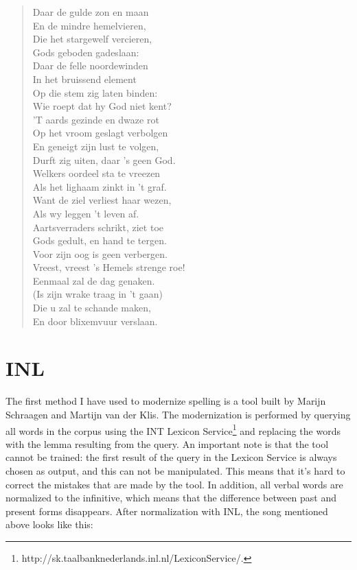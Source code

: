 \begin{quote}
	Daar de gulde zon en maan\\
	En de mindre hemelvieren,\\
	Die het stargewelf vercieren,\\
	Gods geboden gadeslaan:\\
	Daar de felle noordewinden\\
	In het bruissend element\\
	Op die stem zig laten binden:\\
	Wie roept dat hy God niet kent?\\
	
	'T aards gezinde en dwaze rot\\
	Op het vroom geslagt verbolgen\\
	En geneigt zijn lust te volgen,\\
	Durft zig uiten, daar 's geen God.\\
	Welkers oordeel sta te vreezen\\
	Als het lighaam zinkt in 't graf.\\
	Want de ziel verliest haar wezen,\\
	Als wy leggen 't leven af.\\
	
	Aartsverraders schrikt, ziet toe\\
	Gods gedult, en hand te tergen.\\
	Voor zijn oog is geen verbergen.\\
	Vreest, vreest 's Hemels strenge roe!\\
	Eenmaal zal de dag genaken.\\
	(Is zijn wrake traag in 't gaan)\\
	Die u zal te schande maken,\\
	En door blixemvuur verslaan.
\end{quote}

\section{INL}
The first method I have used to modernize spelling is a tool built by Marijn Schraagen and Martijn van der Klis. The modernization is performed by querying all words in the corpus using the INT Lexicon Service\footnote{http://sk.taalbanknederlands.inl.nl/LexiconService/.} and replacing the words with the lemma resulting from the query. An important note is that the tool cannot be trained: the first result of the query in the Lexicon Service is always chosen as output, and this can not be manipulated. This means that it's hard to correct the mistakes that are made by the tool. In addition, all verbal words are normalized to the infinitive, which means that the difference between past and present forms disappears. After normalization with INL, the song mentioned above looks like this:

